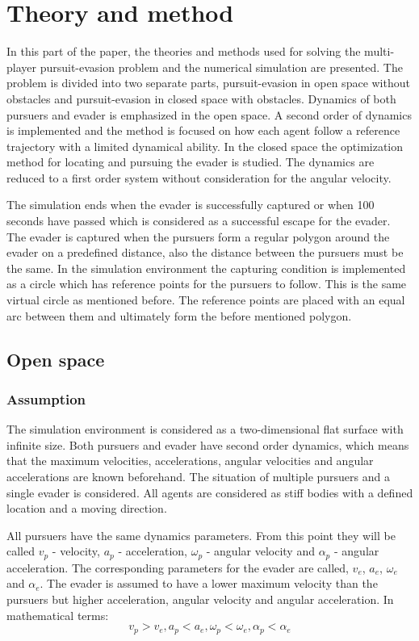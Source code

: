 \documentclass[ebook,11pt] {kth-mag}
\begin{document}
\chapter{Theory and method}
In this part of the paper, the theories and methods used for solving the multi-player pursuit-evasion problem and the numerical simulation are presented. The problem is divided into two separate parts, pursuit-evasion in open space without obstacles and pursuit-evasion in closed space with obstacles. Dynamics of both pursuers and evader is emphasized in the open space. A second order of dynamics is implemented and the method is focused on how each agent follow a reference trajectory with a limited dynamical ability. In the closed space the optimization method for locating and pursuing the evader is studied. The dynamics are reduced to a first order system without consideration for the angular velocity. 

The simulation ends when the evader is successfully captured or when 100 seconds have passed which is considered as a successful escape for the evader. The evader is captured when the pursuers form a regular polygon around the evader on a predefined distance, also the distance between the pursuers must be the same. In the simulation environment the capturing condition is  implemented as a circle which has reference points for the pursuers to follow. This is the same virtual circle as mentioned before. The reference points are placed with an equal arc between them and ultimately form the before mentioned polygon.  

\section{Open space}
\subsection{Assumption}
The simulation environment is considered as a two-dimensional flat surface with infinite size. Both pursuers and evader have second order dynamics, which means that the maximum velocities, accelerations, angular velocities and angular accelerations are known beforehand. The situation of multiple pursuers and a single evader is considered. All agents are considered as stiff bodies with a defined location and a moving direction. 


All pursuers have the same dynamics parameters. From this point they will be called $v_p$ - velocity, $a_p$ - acceleration, $\omega_p$ - angular velocity and $\alpha_p$ - angular acceleration. The corresponding parameters for the evader are called, $v_e$, $a_e$, $\omega_e$ and $\alpha_e$. The evader is assumed to have a lower maximum velocity than the pursuers but  higher acceleration, angular velocity and angular acceleration. 
In mathematical terms: 
$$
v_p > v_e, a_p < a_e, \omega_p < \omega_e, \alpha_p <  \alpha_e
$$
\end{document}

